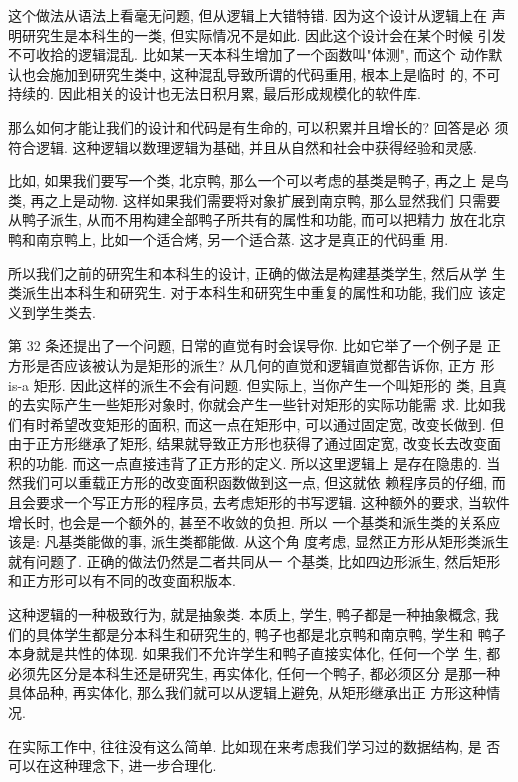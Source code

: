 \documentclass[a4paper]{ctexart}
\theoremstyle{definition}
\theoremstyle{definition}
\begin{document}
这个做法从语法上看毫无问题, 但从逻辑上大错特错. 因为这个设计从逻辑上在
声明研究生是本科生的一类, 但实际情况不是如此. 因此这个设计会在某个时候
引发不可收拾的逻辑混乱. 比如某一天本科生增加了一个函数叫"体测", 而这个
动作默认也会施加到研究生类中, 这种混乱导致所谓的代码重用, 根本上是临时
的, 不可持续的. 因此相关的设计也无法日积月累, 最后形成规模化的软件库.

那么如何才能让我们的设计和代码是有生命的, 可以积累并且增长的? 回答是必
须符合逻辑. 这种逻辑以数理逻辑为基础, 并且从自然和社会中获得经验和灵感.

比如, 如果我们要写一个类, 北京鸭, 那么一个可以考虑的基类是鸭子, 再之上
是鸟类, 再之上是动物. 这样如果我们需要将对象扩展到南京鸭, 那么显然我们
只需要从鸭子派生, 从而不用构建全部鸭子所共有的属性和功能, 而可以把精力
放在北京鸭和南京鸭上, 比如一个适合烤, 另一个适合蒸. 这才是真正的代码重
用.

所以我们之前的研究生和本科生的设计, 正确的做法是构建基类学生, 然后从学
生类派生出本科生和研究生. 对于本科生和研究生中重复的属性和功能, 我们应
该定义到学生类去.

第 32 条还提出了一个问题, 日常的直觉有时会误导你. 比如它举了一个例子是
正方形是否应该被认为是矩形的派生? 从几何的直觉和逻辑直觉都告诉你, 正方
形 is-a 矩形. 因此这样的派生不会有问题. 但实际上, 当你产生一个叫矩形的
类, 且真的去实际产生一些矩形对象时, 你就会产生一些针对矩形的实际功能需
求. 比如我们有时希望改变矩形的面积, 而这一点在矩形中, 可以通过固定宽,
改变长做到. 但由于正方形继承了矩形, 结果就导致正方形也获得了通过固定宽,
改变长去改变面积的功能. 而这一点直接违背了正方形的定义. 所以这里逻辑上
是存在隐患的. 当然我们可以重载正方形的改变面积函数做到这一点, 但这就依
赖程序员的仔细, 而且会要求一个写正方形的程序员, 去考虑矩形的书写逻辑.
这种额外的要求, 当软件增长时, 也会是一个额外的, 甚至不收敛的负担. 所以
一个基类和派生类的关系应该是: 凡基类能做的事, 派生类都能做.  从这个角
度考虑, 显然正方形从矩形类派生就有问题了. 正确的做法仍然是二者共同从一
个基类, 比如四边形派生, 然后矩形和正方形可以有不同的改变面积版本.

这种逻辑的一种极致行为, 就是抽象类. 本质上, 学生, 鸭子都是一种抽象概念,
我们的具体学生都是分本科生和研究生的, 鸭子也都是北京鸭和南京鸭, 学生和
鸭子本身就是共性的体现. 如果我们不允许学生和鸭子直接实体化, 任何一个学
生, 都必须先区分是本科生还是研究生, 再实体化, 任何一个鸭子, 都必须区分
是那一种具体品种, 再实体化, 那么我们就可以从逻辑上避免, 从矩形继承出正
方形这种情况. 

在实际工作中, 往往没有这么简单. 比如现在来考虑我们学习过的数据结构, 是
否可以在这种理念下, 进一步合理化.
\end{document}
